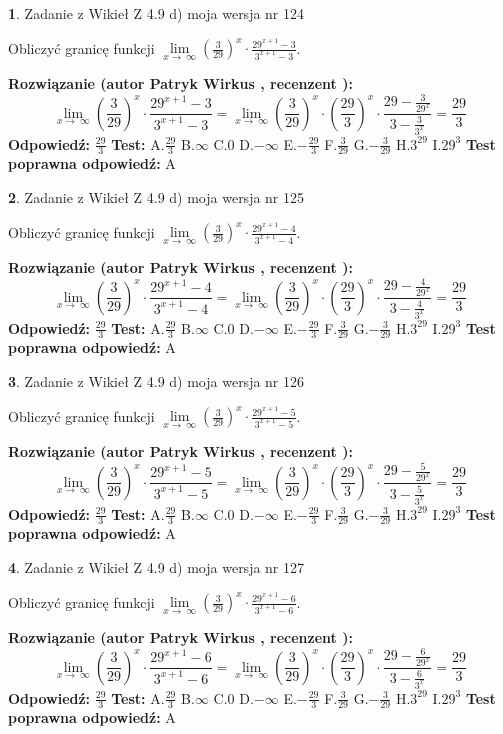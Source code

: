 \documentclass[12pt, a4paper]{article}
\theoremstyle{definition} %
\newtheorem{zad}{}
\newcommand{\zadStart}[1]{\begin{zad}#1\newline}
\newcommand{\zadStop}{\end{zad}}
\newcommand{\rozwStart}[2]{\noindent \textbf{Rozwiązanie (autor #1 , recenzent #2): }\newline}
\newcommand{\rozwStop}{\newline}
\newcommand{\odpStart}{\noindent \textbf{Odpowiedź:}\newline}
\newcommand{\odpStop}{\newline}
\newcommand{\testStart}{\noindent \textbf{Test:}\newline}
\newcommand{\testStop}{\newline}
\newcommand{\kluczStart}{\noindent \textbf{Test poprawna odpowiedź:}\newline}
\newcommand{\kluczStop}{\newline}
\begin{document}
\zadStart{Zadanie z Wikieł Z 4.9 d) moja wersja nr 124}


Obliczyć granicę funkcji  $\lim\limits_{x\to\ \infty}(\frac{3}{29})^{x}\cdot\frac{29^{x+1}-3}{3^{x+1}-3}$.
\zadStop
\rozwStart{Patryk Wirkus}{}
$$\lim\limits_{x\to\ \infty}(\frac{3}{29})^{x}\cdot\frac{29^{x+1}-3}{3^{x+1}-3}=\lim\limits_{x\to\ \infty}(\frac{3}{29})^{x}\cdot(\frac{29}{3})^{x} \cdot \frac{29-\frac{3}{29^{x}}}{3-\frac{3}{3^{x}}} = \frac{29}{3}$$
\rozwStop
\odpStart
$\frac{29}{3}$
\odpStop
\testStart
A.$\frac{29}{3}$ B.$\infty$ C.$0$ D.$-\infty$ E.$-\frac{29}{3}$
F.$\frac{3}{29}$ G.$-\frac{3}{29}$
H.$3^{29}$
I.$29^{3}$
\testStop
\kluczStart
A
\kluczStop



\zadStart{Zadanie z Wikieł Z 4.9 d) moja wersja nr 125}


Obliczyć granicę funkcji  $\lim\limits_{x\to\ \infty}(\frac{3}{29})^{x}\cdot\frac{29^{x+1}-4}{3^{x+1}-4}$.
\zadStop
\rozwStart{Patryk Wirkus}{}
$$\lim\limits_{x\to\ \infty}(\frac{3}{29})^{x}\cdot\frac{29^{x+1}-4}{3^{x+1}-4}=\lim\limits_{x\to\ \infty}(\frac{3}{29})^{x}\cdot(\frac{29}{3})^{x} \cdot \frac{29-\frac{4}{29^{x}}}{3-\frac{4}{3^{x}}} = \frac{29}{3}$$
\rozwStop
\odpStart
$\frac{29}{3}$
\odpStop
\testStart
A.$\frac{29}{3}$ B.$\infty$ C.$0$ D.$-\infty$ E.$-\frac{29}{3}$
F.$\frac{3}{29}$ G.$-\frac{3}{29}$
H.$3^{29}$
I.$29^{3}$
\testStop
\kluczStart
A
\kluczStop



\zadStart{Zadanie z Wikieł Z 4.9 d) moja wersja nr 126}


Obliczyć granicę funkcji  $\lim\limits_{x\to\ \infty}(\frac{3}{29})^{x}\cdot\frac{29^{x+1}-5}{3^{x+1}-5}$.
\zadStop
\rozwStart{Patryk Wirkus}{}
$$\lim\limits_{x\to\ \infty}(\frac{3}{29})^{x}\cdot\frac{29^{x+1}-5}{3^{x+1}-5}=\lim\limits_{x\to\ \infty}(\frac{3}{29})^{x}\cdot(\frac{29}{3})^{x} \cdot \frac{29-\frac{5}{29^{x}}}{3-\frac{5}{3^{x}}} = \frac{29}{3}$$
\rozwStop
\odpStart
$\frac{29}{3}$
\odpStop
\testStart
A.$\frac{29}{3}$ B.$\infty$ C.$0$ D.$-\infty$ E.$-\frac{29}{3}$
F.$\frac{3}{29}$ G.$-\frac{3}{29}$
H.$3^{29}$
I.$29^{3}$
\testStop
\kluczStart
A
\kluczStop



\zadStart{Zadanie z Wikieł Z 4.9 d) moja wersja nr 127}


Obliczyć granicę funkcji  $\lim\limits_{x\to\ \infty}(\frac{3}{29})^{x}\cdot\frac{29^{x+1}-6}{3^{x+1}-6}$.
\zadStop
\rozwStart{Patryk Wirkus}{}
$$\lim\limits_{x\to\ \infty}(\frac{3}{29})^{x}\cdot\frac{29^{x+1}-6}{3^{x+1}-6}=\lim\limits_{x\to\ \infty}(\frac{3}{29})^{x}\cdot(\frac{29}{3})^{x} \cdot \frac{29-\frac{6}{29^{x}}}{3-\frac{6}{3^{x}}} = \frac{29}{3}$$
\rozwStop
\odpStart
$\frac{29}{3}$
\odpStop
\testStart
A.$\frac{29}{3}$ B.$\infty$ C.$0$ D.$-\infty$ E.$-\frac{29}{3}$
F.$\frac{3}{29}$ G.$-\frac{3}{29}$
H.$3^{29}$
I.$29^{3}$
\testStop
\kluczStart
A
\kluczStop
\end{document}
